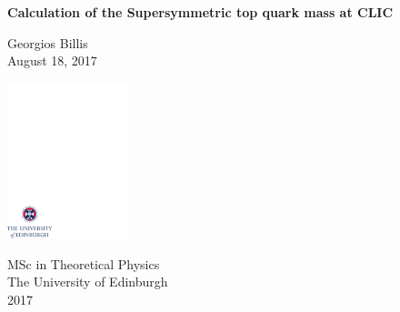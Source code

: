 \documentclass[12pt,a4paper]{report}
\begin{document}
\thispagestyle{empty}

%
\parindent=10pt          %
\parskip=5pt            %
%
%

\vspace*{0.1\textheight}

\begin{center}
        \huge{\bfseries Calculation of the Supersymmetric top quark mass at CLIC}\\
\end{center}

\bigskip

\begin{center}
        \large{Georgios Billis}\\      %
        \bigskip
        \large{August 18, 2017}        %
\end{center}

\vspace*{0.35\textheight}

\begin{center}
        \includegraphics[width=35mm]{crest.pdf}
\end{center}

\medskip

\begin{center}

\large{
  MSc in Theoretical Physics\\[0.8ex]
  The University of Edinburgh\\[0.8ex]
  2017
}

\end{center}
\end{document}
